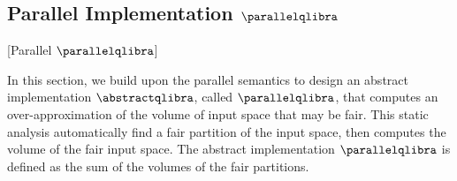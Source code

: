 \subsection{Parallel Implementation \texorpdfstring{$\parallelqlibra$}{QLibra}}[Parallel \texorpdfstring{$\parallelqlibra$}{QLibra}]

In this section, we build upon the parallel semantics to design an abstract implementation $\abstractqlibra$, called $\parallelqlibra$, that computes an over-approximation of the volume of input space that may be fair.
This static analysis automatically find a fair partition of the input space, then computes the volume of the fair input space.
The abstract implementation $\parallelqlibra$ is defined as the sum of the volumes of the fair partitions.

